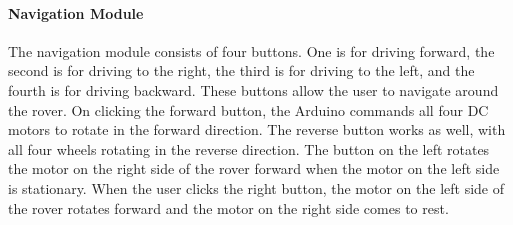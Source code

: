 \documentclass[conference,a4paper]{IEEEtran}
\begin{document}
\paragraph{Navigation Module}
The navigation module consists of four buttons. One is for driving forward, the second is for driving to the right, the third is for driving to the left, and the fourth is for driving backward. These buttons allow the user to navigate  around the rover. On clicking the forward button, the Arduino commands all  four DC motors to rotate in the forward direction. The reverse button works as well, with all  four wheels rotating in the reverse direction. The button on the left rotates the motor on the right side of the rover forward when the motor on the left side is stationary. When the user clicks the right button, the motor on the left side of the rover rotates forward and the motor on the right side comes to rest.
\end{document}
